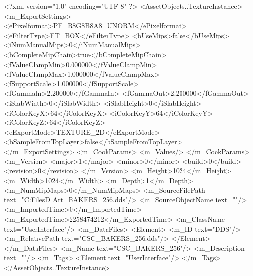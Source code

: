 <?xml version="1.0" encoding="UTF-8" ?>
<AssetObjects..TextureInstance>
	<m_ExportSettings>
		<ePixelformat>PF_R8G8B8A8_UNORM</ePixelformat>
		<eFilterType>FT_BOX</eFilterType>
		<bUseMips>false</bUseMips>
		<iNumManualMips>0</iNumManualMips>
		<bCompleteMipChain>true</bCompleteMipChain>
		<fValueClampMin>0.000000</fValueClampMin>
		<fValueClampMax>1.000000</fValueClampMax>
		<fSupportScale>1.000000</fSupportScale>
		<fGammaIn>2.200000</fGammaIn>
		<fGammaOut>2.200000</fGammaOut>
		<iSlabWidth>0</iSlabWidth>
		<iSlabHeight>0</iSlabHeight>
		<iColorKeyX>64</iColorKeyX>
		<iColorKeyY>64</iColorKeyY>
		<iColorKeyZ>64</iColorKeyZ>
		<eExportMode>TEXTURE_2D</eExportMode>
		<bSampleFromTopLayer>false</bSampleFromTopLayer>
	</m_ExportSettings>
	<m_CookParams>
		<m_Values/>
	</m_CookParams>
	<m_Version>
		<major>1</major>
		<minor>0</minor>
		<build>0</build>
		<revision>0</revision>
	</m_Version>
	<m_Height>1024</m_Height>
	<m_Width>1024</m_Width>
	<m_Depth>1</m_Depth>
	<m_NumMipMaps>0</m_NumMipMaps>
	<m_SourceFilePath text="C:\Users\Shadow\Desktop\Working Files\2D Art\Quarters\Bakers\CSC_BAKERS_256.dds"/>
	<m_SourceObjectName text=""/>
	<m_ImportedTime>0</m_ImportedTime>
	<m_ExportedTime>2258474212</m_ExportedTime>
	<m_ClassName text="UserInterface"/>
	<m_DataFiles>
		<Element>
			<m_ID text="DDS"/>
			<m_RelativePath text="CSC_BAKERS_256.dds"/>
		</Element>
	</m_DataFiles>
	<m_Name text="CSC_BAKERS_256"/>
	<m_Description text=""/>
	<m_Tags>
		<Element text="UserInterface"/>
	</m_Tags>
</AssetObjects..TextureInstance>

